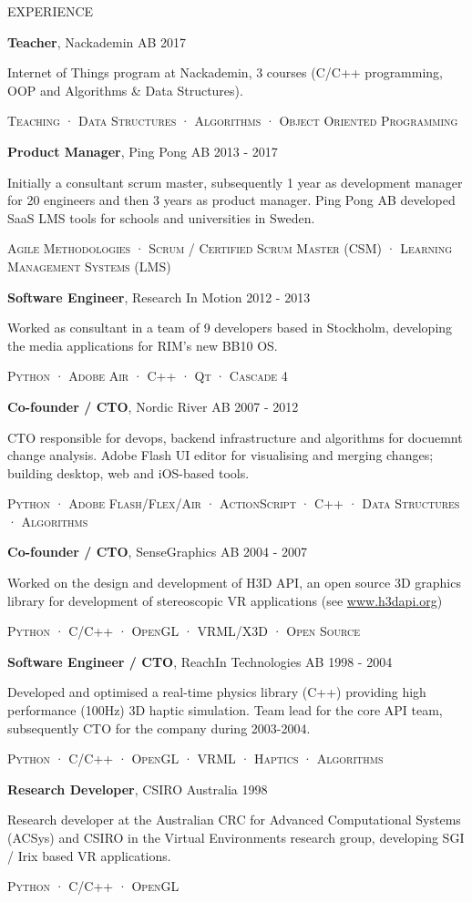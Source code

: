 \documentclass{resume} %
\newcommand{\PRLsep}{\noindent\makebox[\linewidth]{\resizebox{0.1\linewidth}{0.25pt}{$\bullet$}}}
\newcommand{\rExperience}[5]{
  \noindent\begin{minipage}[t]{\linewidth}
    \textbf{#1}, #2 \hfill #3

    #4

    \begin{center} \textsc{\scriptsize #5 } \end{center}
  \end{minipage}
}
\begin{document}
\begin{rSection}{EXPERIENCE}
  \PRLsep

  {\rExperience
    {Teacher} {Nackademin AB} {2017}
    {Internet of Things program at Nackademin, 3 courses (C/C++ programming, OOP and Algorithms \& Data Structures).}
    {Teaching · Data Structures · Algorithms · Object Oriented Programming}
  }

  \PRLsep

  {\rExperience
    {Product Manager} {Ping Pong AB} {2013 - 2017}
    {Initially a consultant scrum master, subsequently 1 year as development manager for 20 engineers and then 3 years as product manager. Ping Pong AB developed SaaS LMS tools for schools and universities in Sweden.}
    {Agile Methodologies · Scrum / Certified Scrum Master (CSM) · Learning Management Systems (LMS)}
  }

  \PRLsep

  {\rExperience
    {Software Engineer} {Research In Motion} {2012 - 2013}
    {Worked as consultant in a team of 9 developers based in Stockholm, developing the media applications for RIM's new BB10 OS.}
    {Python · Adobe Air · C++ · Qt · Cascade 4}
  }

  \PRLsep

  {\rExperience
    {Co-founder / CTO} {Nordic River AB} {2007 - 2012}
    {CTO responsible for devops, backend infrastructure and algorithms for docuemnt change analysis. Adobe Flash UI editor for visualising and merging changes; building desktop, web and iOS-based tools.}
    {Python · Adobe Flash/Flex/Air · ActionScript · C++ · Data Structures · Algorithms}
  }

  \PRLsep

  {\rExperience
    {Co-founder / CTO} {SenseGraphics AB} {2004 - 2007}
    {Worked on the design and development of H3D API, an open source 3D graphics library for development of stereoscopic VR applications (see \href{https://web.archive.org/web/20081217063248/http://www.h3dapi.org:80/}{www.h3dapi.org})}
    {Python · C/C++ · OpenGL · VRML/X3D · Open Source}
  }

  \PRLsep

  {\rExperience
    {Software Engineer / CTO} {ReachIn Technologies AB} {1998 - 2004}
    {Developed and optimised a real-time physics library (C++) providing high performance (100Hz) 3D haptic simulation. Team lead for the core API team, subsequently CTO for the company during 2003-2004.}
    {Python · C/C++ · OpenGL · VRML · Haptics · Algorithms}
  }

  \PRLsep

  {\rExperience
    {Research Developer} {CSIRO Australia} {1998}
    {Research developer at the Australian CRC for Advanced Computational Systems (ACSys) and CSIRO in the Virtual Environments research group, developing SGI / Irix based VR applications.}
    {Python · C/C++ · OpenGL}
  }


\end{rSection}
\end{document}

